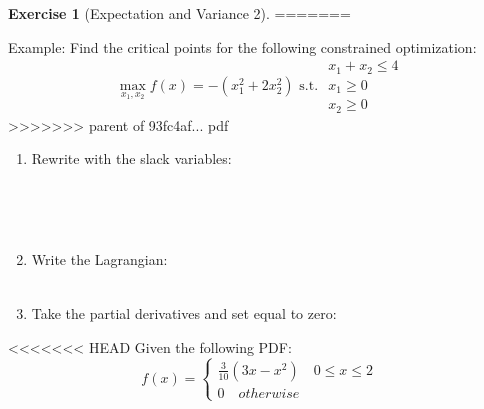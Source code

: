\documentclass[]{book}
\theoremstyle{definition}
\theoremstyle{definition}
\theoremstyle{definition}
\newtheorem{exercise}{Exercise}[chapter]
\theoremstyle{remark}
\begin{document}
\begin{exercise}[Expectation and Variance 2]
\protect\hypertarget{exr:expvar2}{}{\label{exr:expvar2} {} }
=======

\protect\hypertarget{exr:unnamed-chunk-62}{}{\label{exr:unnamed-chunk-62} }Example: Find the critical points for the following constrained optimization:
\[\max_{x_1,x_2} f(x) = -(x_1^2 + 2x_2^2) \text{ s.t. } 
\begin{array}{l}
x_1 + x_2 \le 4\\
x_1 \ge 0\\
x_2 \ge 0
\end{array}\]
>>>>>>> parent of 93fc4af... pdf

\begin{enumerate}
\def\labelenumi{\arabic{enumi}.}
\item
  Rewrite with the slack variables:
  \[\phantom{max_{x_1,x_2} f(x) = -(x_1^2 + 2x_2^2) \text{ s.t. } 
  \begin{array}{l}
  x_1 + x_2 \le 4 - s_1^2\\
  -x_1 \le 0 - s_2^2\\
  -x_2 \le 0 - s_3^2
  \end{array}}\]
\item
  Write the Lagrangian:
  \[\phantom{L(x_1, x_2, \lambda_1, \lambda_2, \lambda_3, s_1, s_2, s_3) =  -(x_1^2 + 2x_2^2) - \lambda_1(x_1 + x_2 + s_1^2  - 4) - \lambda_2(-x_1 + s_2^2) - \lambda_3(-x_2 + s_3^2)}\]
\item
  Take the partial derivatives and set equal to zero:
\end{enumerate}

<<<<<<< HEAD
Given the following PDF:
\[f(x) =  \begin{cases}
              \frac{3}{10}(3x - x^2) \quad 0 \leq x \leq 2\\
               0 \quad otherwise
            \end{cases}
               \]
\end{exercise}
\end{document}

